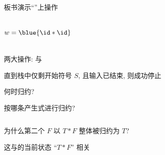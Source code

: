 \begin{frame}{}
  \begin{center}
    板书演示``''上操作

    \begin{columns}
        

        \vspace{-0.80cm}
        \[
          w = \blue{\id \ast \id}
        \]
    \end{columns}

    \vspace{0.60cm}
    两大操作:  与 

    \vspace{0.30cm}
    直到栈中仅剩开始符号 $S$, 且输入已结束, 则成功停止
  \end{center}
\end{frame}

\begin{frame}{}
  \begin{center}

    \vspace{0.80cm}
     何时归约? 

    \vspace{0.80cm}
     按哪条产生式进行归约?
  \end{center}
\end{frame}

\begin{frame}{}
  \begin{center}

    \begin{columns}
        
    \end{columns}

    \vspace{0.50cm}
    为什么第二个 $F$ 以 $T \ast F$ 整体被归约为 $T$?

    \vspace{0.30cm}
    这与的当前状态 ``$T \ast F$'' 相关
  \end{center}
\end{frame}

